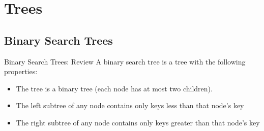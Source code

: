 \documentclass[9pt]{beamer}
\begin{document}
\section{Trees}
\subsection{Binary Search Trees}
\begin{frame}[fragile]{Binary Search Trees: Review}
  A binary search tree is a tree with the following properties:
  \begin{itemize}
    \item
      The tree is a binary tree (each node has at most two children).
    \item
      The left subtree of any node contains only keys less than that node's
      key
    \item
      The right subtree of any node contains only keys greater than that
      node's key
  \end{itemize}

\end{frame}
\end{document}
